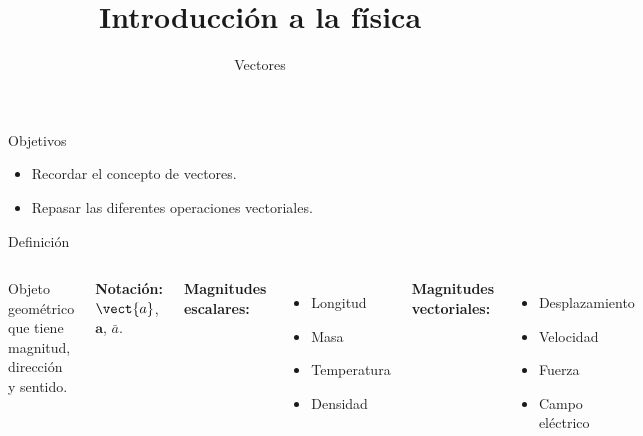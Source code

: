 \documentclass[9pt, aspectratio=169]{beamer}
\title{Introducción a la física}
\subtitle{Vectores}
\begin{document}
\maketitle

\begin{frame}{ Objetivos }

\begin{itemize}
 \item Recordar el concepto de vectores.
 \item Repasar las diferentes operaciones vectoriales.
\end{itemize}
\end{frame}

\begin{frame}{Definición}
\begin{columns}
\cx
\begin{definition}[Vector]
Objeto geométrico que tiene magnitud, dirección y sentido.
\begin{center}
    
\end{center}
\end{definition}

\textbf{Notación:} $\vect{a}$, $\bm{a}$, $\bar{a}$.
\pause

\cx
\textbf{Magnitudes escalares:}
\begin{itemize}
    \item Longitud
    \item Masa
    \item Temperatura
    \item Densidad
\end{itemize}
\textbf{Magnitudes vectoriales:}
\begin{itemize}
    \item Desplazamiento
    \item Velocidad
    \item Fuerza
    \item Campo eléctrico
\end{itemize}
\end{columns}
\end{frame}
\end{document}

